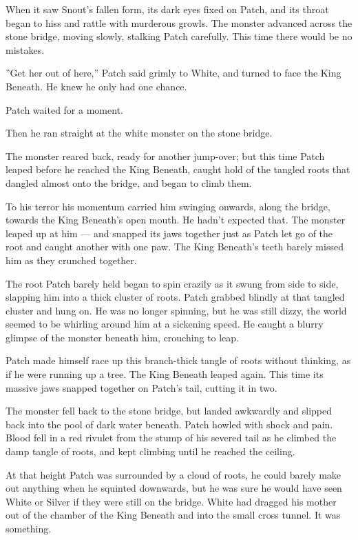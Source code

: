 \documentclass[12pt]{book}
\begin{document}
When it saw Snout's fallen form, its dark eyes fixed on Patch, and its throat began to hiss and rattle with murderous growls. The monster advanced across the stone bridge, moving slowly, stalking Patch carefully. This time there would be no mistakes.

''Get her out of here,'' Patch said grimly to White, and turned to face the King Beneath. He knew he only had one chance.

Patch waited for a moment.

Then he ran straight at the white monster on the stone bridge.

The monster reared back, ready for another jump-over; but this time Patch leaped before he reached the King Beneath, caught hold of the tangled roots that dangled almost onto the bridge, and began to climb them.

To his terror his momentum carried him swinging onwards, along the bridge, towards the King Beneath's open mouth. He hadn't expected that. The monster leaped up at him ---
and snapped its jaws together just as Patch let go of the root and caught another with one paw. The King Beneath's teeth barely missed him as they crunched together.

The root Patch barely held began to spin crazily as it swung from side to side, slapping him into a thick cluster of roots. Patch grabbed blindly at that tangled cluster and hung on. He was no longer spinning, but he was still dizzy, the world seemed to be whirling around him at a sickening speed. He caught a blurry glimpse of the monster beneath him, crouching to leap.

Patch made himself race up this branch-thick tangle of roots without thinking, as if he were running up a tree. The King Beneath leaped again. This time its massive jaws snapped together on Patch's tail, cutting it in two.

The monster fell back to the stone bridge, but landed awkwardly and slipped back into the pool of dark water beneath. Patch howled with shock and pain. Blood fell in a red rivulet from the stump of his severed tail as he climbed the damp tangle of roots, and kept climbing until he reached the ceiling.

At that height Patch was surrounded by a cloud of roots, he could barely make out anything when he squinted downwards, but he was sure he would have seen White or Silver if they were still on the bridge. White had dragged his mother out of the chamber of the King Beneath and into the small cross tunnel. It was something. 
\end{document}

